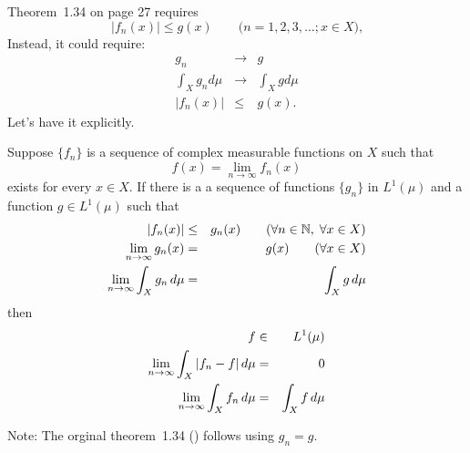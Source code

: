 Theorem~1.34 on page 27 requires
\begin{equation*}
|f_n(x)| \leq g(x) \qquad \textrm{(}n=1,2,3,\ldots; x\in X\textrm{),}
\end{equation*}
Instead, it could require:
\begin{eqnarray*}
g_n &\to& g \\
\int_X g_n d\mu  &\to& \int_X g d\mu  \\
|f_n(x)| &\leq& g(x).
\end{eqnarray*}
Let's have it explicitly.
\begin{llem} \label{lem:Lebesgue:domvar}
Suppose \(\{f_n\}\) is a sequence of complex measurable functions on $X$ such that
\begin{equation*}
 f(x) = \lim_{n\to\infty} f_n(x)
\end{equation*}
exists for every \(x\in X\). If there is a a sequence of functions \(\{g_n\}\)
in \(L^1(\mu)\) and a function \(g\in L^1(\mu)\)
such that
\begin{eqnarray*}
   |f_n(x)| &\leq& g_n(x) \qquad (\forall n\in\mathbb{N},\;\forall x\in X) \\
  \lim_{n\to\infty} g_n(x) &=& g(x) \qquad (\forall x\in X) \\
  \lim_{n\to\infty} \int_X g_n\,d\mu  &=& \int_X g\,d\mu
\end{eqnarray*}
then
\begin{eqnarray}
  f &\in& L^1(\mu) \notag \\
  \lim_{n\to\infty} \int_X |f_n - f|\,d\mu  & = & 0 \label{eq:leb:domv1} \\
  \lim_{n\to\infty} \int_X f_n\,d\mu  & = & \int_X f\,d\mu \label{eq:leb:domv2}
\end{eqnarray}
\end{llem}
Note: The orginal theorem~1.34 (\cite{RudinRCA80}) follows using \(g_n=g\).

